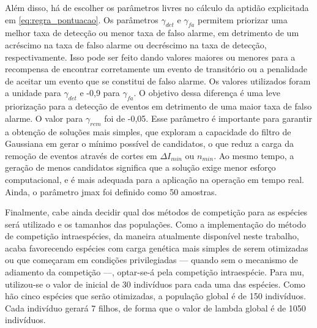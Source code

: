 Além disso, há de escolher os parâmetros livres no cálculo da aptidão
explicitada em \ref{eq:regra_pontuacao}. Os parâmetros $\gamma_{det}$
e $\gamma_{fa}$ permitem priorizar uma melhor taxa de detecção ou
menor taxa de falso alarme, em detrimento de um acréscimo na taxa de
falso alarme ou decréscimo na taxa de detecção, respectivamente. Isso
pode ser feito dando valores maiores ou menores para a recompensa de
encontrar corretamente um evento de transitório ou a penalidade de
aceitar um evento que se constitui de falso alarme.
Os valores utilizados foram a unidade para $\gamma_{det}$ e -0,9 para
$\gamma_{fa}$. O objetivo dessa diferença é uma leve priorização para
a detecção de eventos em detrimento de uma maior taxa de falso alarme.
O valor para $\gamma_{rem}$ foi de -0,05. Esse parâmetro é importante
para garantir a obtenção de soluções mais simples, que exploram a
capacidade do filtro de Gaussiana em gerar o mínimo possível de
candidatos, o que reduz a carga da remoção de eventos através de
cortes em $\Delta{I}_{min}$ ou $n_{min}$. Ao mesmo tempo,
a geração de menos candidatos significa que a solução exige menor
esforço computacional, e é mais adequada para a aplicação na operação
em tempo real. Ainda, o parâmetro \acs{jmax} foi definido como 50
amostras.

Finalmente, cabe ainda decidir qual dos métodos de competição para as
espécies será utilizado e os tamanhos das populações. Como a
implementação do método de competição intraespécies, da maneira
atualmente disponível neste trabalho, acaba favorecendo espécies com
carga genética mais simples de serem otimizadas ou que começaram em
condições privilegiadas --- quando sem o mecanismo de adiamento da
competição ---, optar-se-á pela competição intraespécie. Para
\acs{mu}, utilizou-se o valor de inicial de 30 indivíduos para cada
uma das espécies. Como hão cinco espécies que serão otimizadas, a
população global é de 150 indivíduos. Cada indivíduo gerará 7 filhos,
de forma que o valor de \acs{lambda} global é de 1050 indivíduos.





